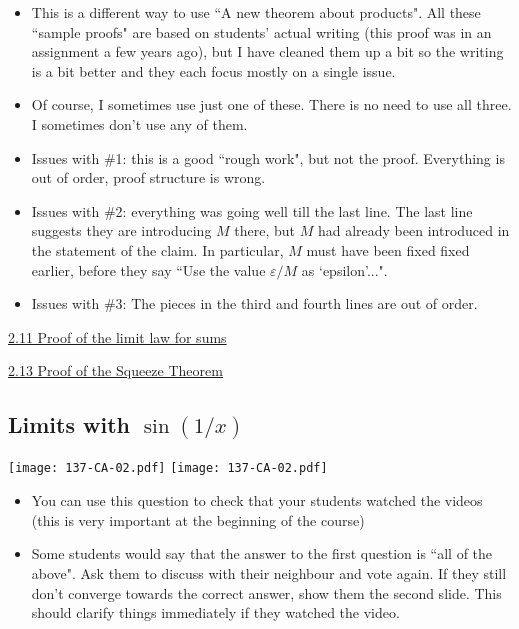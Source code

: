 \documentclass[11pt]{article}
\newcommand{\n}{\newpage}
\newcommand{\e}{\varepsilon}
\newcommand{\nl}{\hfill \vspace{-1.1\baselineskip}} %
\newcommand{\vxi}{\hspace{8mm} \href{https://www.youtube.com/watch?v=p8Ox1LtXyCA&list=PLlwePzQY_wW8P_I8BFgm0-upywEwTKd8_&index=11}{2.11 Proof of the limit law for sums}}
\newcommand{\vxiii}{\hspace{8mm} \href{https://www.youtube.com/watch?v=vTonfq94c8s&list=PLlwePzQY_wW8P_I8BFgm0-upywEwTKd8_&index=13}{2.13 Proof of the Squeeze Theorem}}
\begin{document}
\begin{comments}
\nl
	\begin{itemize}
		\item  This is a different way to use ``A new theorem about products".  All these ``sample proofs" are based on students' actual writing (this proof was in an assignment a few years ago), but I have cleaned them up a bit so the writing is a bit better and they each focus mostly on a single issue.
		\item Of course, I sometimes use just one of these.  There is no need to use all three.  I sometimes don't use any of them.
		\item Issues with \#1: this is a good ``rough work", but not the proof.  Everything is out of order, proof structure is wrong.
		\item Issues with \#2: everything was going well till the last line.    The last line suggests they are introducing $M$ there, but $M$ had already been introduced in the statement of the claim.  In particular, $M$ must have been fixed  fixed earlier, before they say ``Use the value $\e/M$ as `epsilon'...".      
		\item Issues with \#3:  The pieces in the third and fourth lines are out of order.
	\end{itemize}
\end{comments}

\begin{videos}
\vxi 

\vxiii
\end{videos}

\n


\subsection{Limits with $\sin(1/x)$} 
\begin{center}
{ \texttt{[image: 137-CA-02.pdf]}} 
{ \texttt{[image: 137-CA-02.pdf]}}
\end{center}

\begin{comments}
\nl
	\begin{itemize}
	\item You can use this question to check that your students watched the videos (this is very important at the beginning of the course)
	\item Some students would say that the answer to the first question is ``all of the above". Ask them to discuss with their neighbour and vote again. If they still don't converge towards the correct answer, show them the second slide. This should clarify things immediately if they watched the video.
	\end{itemize}
\end{comments}
\end{document}
